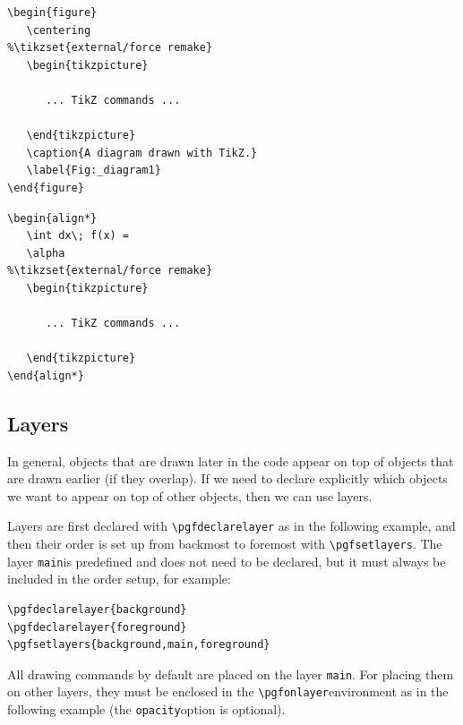 \documentclass[10pt,letterpaper,twoside,notitlepage]{article}
\numberwithin{figure}{section}
\begin{document}
\noindent
\begin{minipage}{0.6\linewidth}
\brocol\begin{verbatim}
\begin{figure}
   \centering
%\tikzset{external/force remake}
   \begin{tikzpicture}
		
      ... TikZ commands ...

   \end{tikzpicture}
   \caption{A diagram drawn with TikZ.}
   \label{Fig:_diagram1}
\end{figure}
\end{verbatim}\txcol
\end{minipage}
%
\begin{minipage}{0.39\linewidth}
\brocol\begin{verbatim}
\begin{align*}
   \int dx\; f(x) =		
   \alpha
%\tikzset{external/force remake}
   \begin{tikzpicture}
		
      ... TikZ commands ...

   \end{tikzpicture}
\end{align*}
\end{verbatim}\txcol
\end{minipage}
%
\subsection{Layers}
\label{Apx_tikzbasics_layers}
%
\noindent
In general, objects that are drawn later in the code appear 
on top of objects that are drawn earlier (if they overlap).
If we need to declare explicitly which objects
we want to appear on top of other objects,
then we can use layers.

Layers are first declared with \brocol\verb$\pgfdeclarelayer$\txcol
as in the following example, and then their order is set up
from backmost to foremost with \brocol\verb$\pgfsetlayers$\txcol.
The layer \brocol\verb$main$\txcol is predefined and does not need 
to be declared, but it must always be included in the order setup,
for example:
%
\brocol\begin{verbatim}
\pgfdeclarelayer{background}
\pgfdeclarelayer{foreground}
\pgfsetlayers{background,main,foreground}
\end{verbatim}\txcol
%
All drawing commands by default are placed on the layer 
\brocol\verb$main$\txcol.
For placing them on other layers, they must be enclosed in the 
\brocol\verb$\pgfonlayer$\txcol environment as in the following example
(the \brocol\verb$opacity$\txcol option is optional).\\
\end{document}
